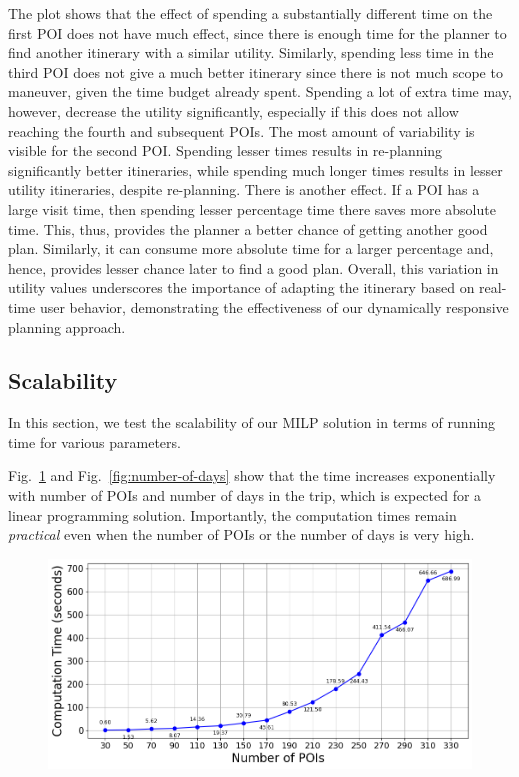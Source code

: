 The plot shows that the effect of spending a substantially different time on the first POI does not have much effect, since there is enough time for the planner to find another itinerary with a similar utility.
Similarly, spending less time in the third POI does not give a much better itinerary since there is not much scope to maneuver, given the time budget already spent. Spending a lot of extra time may, however, decrease the utility significantly, especially if this does not allow reaching the fourth and subsequent POIs.
The most amount of variability is visible for the second POI.
Spending lesser times results in re-planning significantly better itineraries, while spending much longer times results in lesser utility itineraries, despite re-planning.
There is another effect.
If a POI has a large visit time, then spending lesser percentage time there
saves more absolute time. This, thus, provides the planner a better chance of getting another good plan. Similarly, it can consume more absolute time for a larger percentage and, hence, provides lesser chance later to find a good plan.
Overall, this variation in utility values underscores the importance of adapting the itinerary based on real-time user behavior, demonstrating the effectiveness of our dynamically responsive planning approach.

\subsection{Scalability}

In this section, we test the scalability of our MILP solution in terms of running time for various parameters.

Fig.~\ref{fig:number-of-pois} and Fig.~\ref{fig:number-of-days} show that the time increases exponentially with number of POIs and number of days in the trip, which is expected for a linear programming solution.
Importantly, the computation times remain \emph{practical} even when the number of POIs or the number of days is very high.

\begin{figure}[t]
    \centering
    \includegraphics[width=\figwidth]{plots/scalability_new_pkj.png}
    \label{fig:number-of-pois}
\end{figure}


